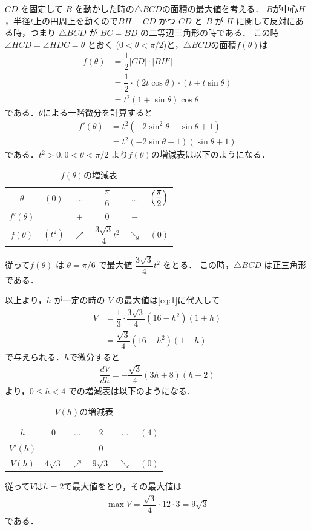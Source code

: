 \documentclass[../../main.tex]{subfiles}
\begin{document}
$CD$ を固定して $B$ を動かした時の$\triangle BCD$の面積の最大値を考える．
$B$が中心$H$，半径$t$上の円周上を動くので$BH \perp CD$ かつ $CD$ と $B$ が $H$ に関して反対にある時，つまり $\triangle BCD$ が $BC=BD$ の二等辺三角形の時である．
この時 $\angle HCD = \angle HDC = \theta$ とおく ($0 < \theta < \pi/2$)と，$\triangle BCD$の面積$f(\theta)$は
\begin{align}
  f(\theta)
  &= \dfrac{1}{2} |CD| \cdot |BH'| \\
  &= \dfrac{1}{2} \cdot (2 t \cos\theta) \cdot (t + t \sin\theta) \\
  &= t^2 (1 + \sin\theta) \cos\theta
\end{align}
である．$\theta$による一階微分を計算すると
\begin{align}
  f'(\theta)
  &= t^2 (-2\sin^2\theta - \sin\theta + 1) \\
  &= t^2 (-2\sin\theta+1)(\sin\theta+1)
\end{align}
である．$t^2 > 0, 0 < \theta < \pi/2$ より$f(\theta)$の増減表は以下のようになる．

\begin{table}[htb]
  \centering
  \caption{$f(\theta)$の増減表}
  \label{tab:utokyo1988q6_base_area}
  \renewcommand{\arraystretch}{1.4}
  \begin{tabular}{c|c|c|c|c|c}
    $\theta$ & $(0)$ & $\dots$ & $\dfrac{\pi}{6}$ & $\dots$ & $\Bigl(\dfrac{\pi}{2}\Bigr)$ \\ \hline
    $f'(\theta)$ & & $+$ & $0$ & $-$ & \\ \hline
    $f(\theta)$ & $(t^2)$ & $\nearrow$ & $\dfrac{3\sqrt{3}}{4}t^2$ & $\searrow$ & $(0)$
  \end{tabular}
\end{table}

従って$f(\theta)$ は $\theta = \pi/6$ で最大値 $\dfrac{3\sqrt{3}}{4} t^2$ をとる．
この時，$\triangle BCD$ は正三角形である．

以上より，$h$ が一定の時の $V$ の最大値は\cref{eq:1}に代入して
\begin{align}
  V &= \dfrac{1}{3} \cdot \dfrac{3\sqrt{3}}{4} (16-h^2) (1+h) \\
  &= \dfrac{\sqrt{3}}{4} (16-h^2) (1+h)
\end{align}
で与えられる．$h$で微分すると
\begin{align}
  \dfrac{dV}{dh} = -\dfrac{\sqrt{3}}{4}(3h+8)(h-2)
\end{align}
より，$0 \le h < 4$ での増減表は以下のようになる．

\begin{table}[htb]
  \centering
  \caption{$V(h)$の増減表}
  \label{tab:utokyo1988q6_volume}
  \renewcommand{\arraystretch}{1.4}
  \begin{tabular}{c|c|c|c|c|c}
    $h$ & $0$ & $\dots$ & $2$ & $\dots$ & $(4)$ \\ \hline
    $V'(h)$ & & $+$ & $0$ & $-$ & \\ \hline
    $V(h)$ & $4\sqrt{3}$ & $\nearrow$ & $9\sqrt{3}$ & $\searrow$ & $(0)$
  \end{tabular}
\end{table}

従って$V$は$h=2$で最大値をとり，その最大値は
\begin{align}
  \max V = \dfrac{\sqrt{3}}{4} \cdot 12 \cdot 3 = 9\sqrt{3}
\end{align}
である．
\end{document}
